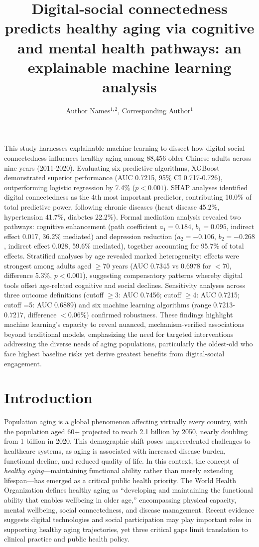 \documentclass[10pt]{article}
\title{\textbf{Digital-social connectedness predicts healthy aging via cognitive and mental health pathways: an explainable machine learning analysis}}
\author{Author Names$^{1,2}$, Corresponding Author$^{1}$}
\date{}
\begin{document}
\maketitle

\noindent This study harnesses explainable machine learning to dissect how digital-social connectedness influences healthy aging among 88,456 older Chinese adults across nine years (2011-2020). Evaluating six predictive algorithms, XGBoost demonstrated superior performance (AUC 0.7215, 95\% CI 0.717-0.726), outperforming logistic regression by 7.4\% ($p<0.001$). SHAP analyses identified digital connectedness as the 4th most important predictor, contributing 10.0\% of total predictive power, following chronic diseases (heart disease 45.2\%, hypertension 41.7\%, diabetes 22.2\%). Formal mediation analysis revealed two pathways: cognitive enhancement (path coefficient $a_1=0.184$, $b_1=0.095$, indirect effect 0.017, 36.2\% mediated) and depression reduction ($a_2=-0.106$, $b_2=-0.268$, indirect effect 0.028, 59.6\% mediated), together accounting for 95.7\% of total effects. Stratified analyses by age revealed marked heterogeneity: effects were strongest among adults aged $\geq$70 years (AUC 0.7345 vs 0.6978 for $<$70, difference 5.3\%, $p<0.001$), suggesting compensatory patterns whereby digital tools offset age-related cognitive and social declines. Sensitivity analyses across three outcome definitions (cutoff $\geq$3: AUC 0.7456; cutoff $\geq$4: AUC 0.7215; cutoff =5: AUC 0.6889) and six machine learning algorithms (range 0.7213-0.7217, difference $<$0.06\%) confirmed robustness. These findings highlight machine learning's capacity to reveal nuanced, mechanism-verified associations beyond traditional models, emphasizing the need for targeted interventions addressing the diverse needs of aging populations, particularly the oldest-old who face highest baseline risks yet derive greatest benefits from digital-social engagement.

\section*{Introduction}

Population aging is a global phenomenon affecting virtually every country, with the population aged 60+ projected to reach 2.1 billion by 2050, nearly doubling from 1 billion in 2020. This demographic shift poses unprecedented challenges to healthcare systems, as aging is associated with increased disease burden, functional decline, and reduced quality of life. In this context, the concept of \textit{healthy aging}---maintaining functional ability rather than merely extending lifespan---has emerged as a critical public health priority. The World Health Organization defines healthy aging as ``developing and maintaining the functional ability that enables wellbeing in older age,'' encompassing physical capacity, mental wellbeing, social connectedness, and disease management. Recent evidence suggests digital technologies and social participation may play important roles in supporting healthy aging trajectories, yet three critical gaps limit translation to clinical practice and public health policy.
\end{document}
